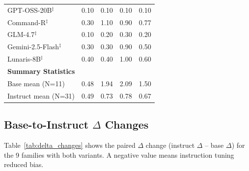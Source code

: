 \begin{table}[h]
\begin{tabular}{lcccc}
GPT-OSS-20B$^\ddagger$ & 0.10 & 0.10 & 0.10 & 0.10 \\
Command-R$^\ddagger$ & 0.30 & 1.10 & 0.90 & 0.77 \\
GLM-4.7$^\ddagger$ & 0.10 & 0.20 & 0.30 & 0.20 \\
Gemini-2.5-Flash$^\ddagger$ & 0.30 & 0.30 & 0.90 & 0.50 \\
Lunaris-8B$^\ddagger$ & 0.40 & 0.40 & 1.00 & 0.60 \\
\midrule
\multicolumn{5}{l}{\textbf{Summary Statistics}} \\
\midrule
Base mean (N=11) & 0.48 & 1.94 & 2.09 & 1.50 \\
Instruct mean (N=31) & 0.49 & 0.73 & 0.78 & 0.67 \\
\bottomrule
\end{tabular}
\par\vspace{2mm}
\end{table}

\subsection{Base-to-Instruct $\Delta$ Changes}

Table~\ref{tab:delta_changes} shows the paired $\Delta$ change (instruct $\Delta$ -- base $\Delta$) for the 9 families with both variants. A negative value means instruction tuning reduced bias.

